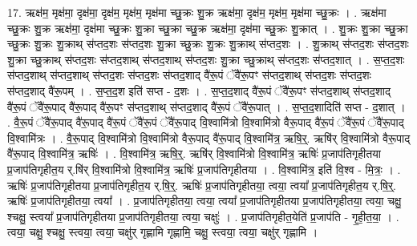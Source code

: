 \documentclass[17pt]{extarticle}
\begin{document}
17. ऋक्ष॑म॒ मृक्ष॑मा॒ दृक्ष॑मा॒ दृक्ष॑म॒ मृक्ष॑म॒ मृक्ष॑मा च्छु॒क्रः शु॒क्र ऋक्ष॑मा॒ दृक्ष॑म॒ मृक्ष॑म॒ मृक्ष॑मा च्छु॒क्रः । . ऋक्ष॑मा च्छु॒क्रः शु॒क्र ऋक्ष॑मा॒ दृक्ष॑मा च्छु॒क्रः शु॒क्रा च्छु॒क्रा च्छु॒क्र ऋक्ष॑मा॒ दृक्ष॑मा च्छु॒क्रः शु॒क्रात् । . शु॒क्रः शु॒क्रा च्छु॒क्रा च्छु॒क्रः शु॒क्रः शु॒क्राथ् स॑प्तद॒शः स॑प्तद॒शः शु॒क्रा च्छु॒क्रः शु॒क्रः शु॒क्राथ् स॑प्तद॒शः । . शु॒क्राथ् स॑प्तद॒शः स॑प्तद॒शः शु॒क्रा च्छु॒क्राथ् स॑प्तद॒शः स॑प्तद॒शाथ् स॑प्तद॒शाथ् स॑प्तद॒शः शु॒क्रा च्छु॒क्राथ् स॑प्तद॒शः स॑प्तद॒शात् । . स॒प्त॒द॒शः स॑प्तद॒शाथ् स॑प्तद॒शाथ् स॑प्तद॒शः स॑प्तद॒शः स॑प्तद॒शाद् वै॑रू॒पं ॅवै॑रू॒पꣳ स॑प्तद॒शाथ् स॑प्तद॒शः स॑प्तद॒शः स॑प्तद॒शाद् वै॑रू॒पम् । . स॒प्त॒द॒श इति॑ सप्त - द॒शः । . स॒प्त॒द॒शाद् वै॑रू॒पं ॅवै॑रू॒पꣳ स॑प्तद॒शाथ् स॑प्तद॒शाद् वै॑रू॒पं ॅवै॑रू॒पाद् वै॑रू॒पाद् वै॑रू॒पꣳ स॑प्तद॒शाथ् स॑प्तद॒शाद् वै॑रू॒पं ॅवै॑रू॒पात् । . स॒प्त॒द॒शादिति॑ सप्त - द॒शात् । . वै॒रू॒पं ॅवै॑रू॒पाद् वै॑रू॒पाद् वै॑रू॒पं ॅवै॑रू॒पं ॅवै॑रू॒पाद् वि॒श्वामि॑त्रो वि॒श्वामि॑त्रो वैरू॒पाद् वै॑रू॒पं ॅवै॑रू॒पं ॅवै॑रू॒पाद् वि॒श्वामि॑त्रः । . वै॒रू॒पाद् वि॒श्वामि॑त्रो वि॒श्वामि॑त्रो वैरू॒पाद् वै॑रू॒पाद् वि॒श्वामि॑त्र॒ ऋषि॒र्॒. ऋषि॑र् वि॒श्वामि॑त्रो वैरू॒पाद् वै॑रू॒पाद् वि॒श्वामि॑त्र॒ ऋषिः॑ । . वि॒श्वामि॑त्र॒ ऋषि॒र्॒. ऋषि॑र् वि॒श्वामि॑त्रो वि॒श्वामि॑त्र॒ ऋषिः॑ प्र॒जाप॑तिगृहीतया प्र॒जाप॑तिगृहीत॒य र्.षि॑र् वि॒श्वामि॑त्रो वि॒श्वामि॑त्र॒ ऋषिः॑ प्र॒जाप॑तिगृहीतया । . वि॒श्वामि॑त्र॒ इति॑ वि॒श्व - मि॒त्रः॒ । . ऋषिः॑ प्र॒जाप॑तिगृहीतया प्र॒जाप॑तिगृहीत॒य र्.षि॒र्॒. ऋषिः॑ प्र॒जाप॑तिगृहीतया॒ त्वया॒ त्वया᳚ प्र॒जाप॑तिगृहीत॒य र्.षि॒र्॒. ऋषिः॑ प्र॒जाप॑तिगृहीतया॒ त्वया᳚ । . प्र॒जाप॑तिगृहीतया॒ त्वया॒ त्वया᳚ प्र॒जाप॑तिगृहीतया प्र॒जाप॑तिगृहीतया॒ त्वया॒ चक्षु॒ श्चक्षु॒ स्त्वया᳚ प्र॒जाप॑तिगृहीतया प्र॒जाप॑तिगृहीतया॒ त्वया॒ चक्षुः॑ । . प्र॒जाप॑तिगृहीत॒येति॑ प्र॒जाप॑ति - गृ॒ही॒त॒या॒ । . त्वया॒ चक्षु॒ श्चक्षु॒ स्त्वया॒ त्वया॒ चक्षु॑र् गृह्णामि गृह्णामि॒ चक्षु॒ स्त्वया॒ त्वया॒ चक्षु॑र् गृह्णामि । \newline
\end{document}
